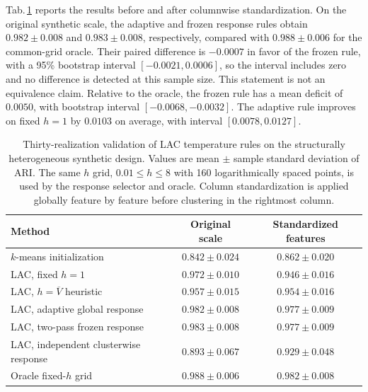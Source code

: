 \documentclass[11pt,a4paper]{article}
\theoremstyle{definition}
\theoremstyle{plain}
\begin{document}
Tab.\,\ref{tab:lac_multiseed} reports the results before and after columnwise standardization. On the original synthetic scale, the adaptive and frozen response rules obtain $0.982\pm0.008$ and $0.983\pm0.008$, respectively, compared with $0.988\pm0.006$ for the common-grid oracle. Their paired difference is $-0.0007$ in favor of the frozen rule, with a 95\% bootstrap interval $[-0.0021,0.0006]$, so the interval includes zero and no difference is detected at this sample size. This statement is not an equivalence claim. Relative to the oracle, the frozen rule has a mean deficit of $0.0050$, with bootstrap interval $[-0.0068,-0.0032]$. The adaptive rule improves on fixed $h=1$ by $0.0103$ on average, with interval $[0.0078,0.0127]$.

\begin{table}[htbp]
\centering
\begingroup
\renewcommand{\arraystretch}{1.42}
\setlength{\tabcolsep}{6pt}
\caption{Thirty-realization validation of LAC temperature rules on the structurally heterogeneous synthetic design. Values are mean $\pm$ sample standard deviation of ARI. The same $h$ grid, $0.01\le h\le8$ with 160 logarithmically spaced points, is used by the response selector and oracle. Column standardization is applied globally feature by feature before clustering in the rightmost column.}
\label{tab:lac_multiseed}
\begin{tabular}{lcc}
\toprule
\textbf{Method} & \textbf{Original scale} & \textbf{Standardized features}\\
\midrule
$k$-means initialization & $0.842\pm0.024$ & $0.862\pm0.020$\\
LAC, fixed $h=1$ & $0.972\pm0.010$ & $0.946\pm0.016$\\
LAC, $h=\overline V$ heuristic & $0.957\pm0.015$ & $0.954\pm0.016$\\
LAC, adaptive global response & $0.982\pm0.008$ & $0.977\pm0.009$\\
LAC, two-pass frozen response & $0.983\pm0.008$ & $0.977\pm0.009$\\
LAC, independent clusterwise response & $0.893\pm0.067$ & $0.929\pm0.048$\\
Oracle fixed-$h$ grid & $0.988\pm0.006$ & $0.982\pm0.008$\\
\bottomrule
\end{tabular}
\endgroup
\end{table}
\end{document}

